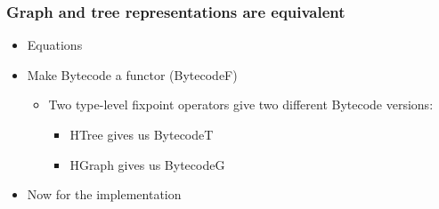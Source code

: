         \begin{frame}
            \frametitle{Graph and tree representations are equivalent}

            \begin{itemize}
                \item Equations
                \item Make Bytecode a functor (BytecodeF)
                    \begin{itemize}
                        \item Two type-level fixpoint operators give two different Bytecode versions:
                        \begin{itemize}
                            \item HTree gives us BytecodeT
                            \item HGraph gives us BytecodeG
                        \end{itemize}
                    \end{itemize}

                \item Now for the implementation
            \end{itemize}
        \end{frame}
